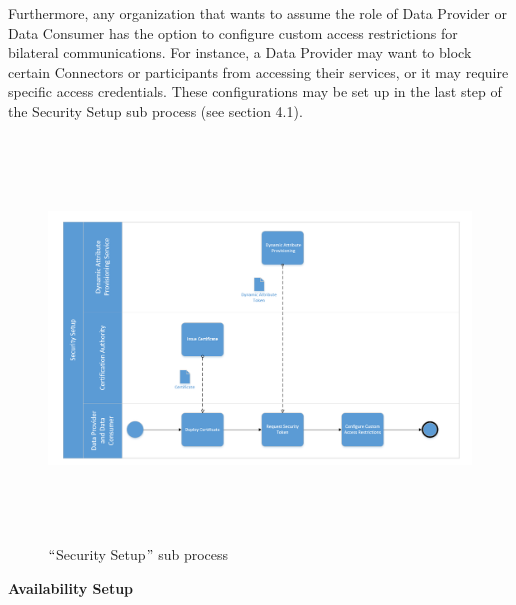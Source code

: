 Furthermore, any organization that wants to assume the role of Data Provider or Data Consumer has the option to configure custom access restrictions for bilateral communications. For instance, a Data Provider may want to block certain Connectors or participants from accessing their services, or it may require specific access credentials. These configurations may be set up in the last step of the Security Setup sub process (see section 4.1).




\begin{figure}[H]
	\begin{Center}
		\includegraphics[width=7.03in,height=4.22in]{./media/image24.png}
		\caption{$``$Security Setup$"$  sub process}
		\label{fig:Security_Setup_sub_process}
	\end{Center}
\end{figure}





\textbf{Availability Setup}

